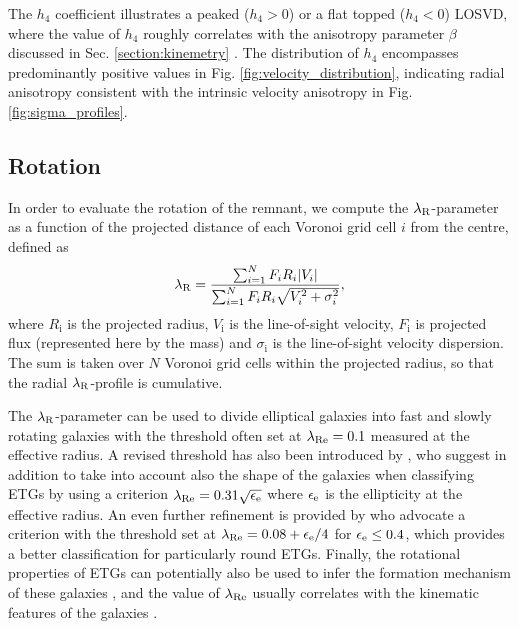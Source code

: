 \documentclass[a4paper,fleqn,usenatbib]{mnras}
\begin{document}
The $h_4$ coefficient illustrates a peaked ($h_4>0$) or a flat topped ($h_4<0$) LOSVD, where the value
of $h_4$ roughly correlates with the anisotropy parameter $\beta$ discussed in Sec. \ref{section:kinemetry}
\citep{1993ApJ...407..525V, 1993MNRAS.265..213G}.
The distribution of $h_4$ encompasses predominantly positive values in Fig. \ref{fig:velocity_distribution}, indicating radial anisotropy
consistent with the intrinsic velocity anisotropy in Fig. \ref{fig:sigma_profiles}.

\subsection{Rotation}


In order to evaluate the rotation of the remnant, we compute the $\lambda_{\rm{R}}$-parameter 
\citep{2007MNRAS.379..401E, 2014MNRAS.444.3357N} as
a function of the projected distance of each Voronoi grid cell $i$ from the centre, defined as
\begin{equation}
 \lambda_{\rm{R}}=\frac{\sum_{i=1}^{N} F_i R_i|V_i|}{\sum_{i=1}^{N} F_i 
R_i\sqrt{V_i^2+\sigma_i^2}},
\end{equation}
where $R_\mathrm{i}$ is the projected radius, $V_\mathrm{i}$ is the 
line-of-sight velocity, $F_\mathrm{i}$ is projected flux (represented here by 
the mass) and $\sigma_\mathrm{i}$ is the line-of-sight velocity dispersion. The
sum is taken over $N$ Voronoi grid cells within the projected radius, so that the radial
$\lambda_{\rm{R}}$-profile is cumulative.

The $\lambda_{\rm{R}}$-parameter can be used to divide elliptical galaxies into fast and slowly 
rotating galaxies with the threshold often set at $\lambda_{\rm{Re}}=0.1$ measured at the effective radius.
A revised threshold has also been
introduced by \citet{2011MNRAS.414..888E}, who suggest in addition to take into account also the shape of 
the galaxies when classifying ETGs by using a criterion $\lambda_{\rm{Re}}=0.31\sqrt{\epsilon_{\rm{e}}}$
where $\epsilon_{\rm{e}}$ is the ellipticity at the effective radius.
An even further refinement is provided by \citet{2016ARA&A..54..597C} who advocate a 
criterion with the threshold set at $\lambda_{\rm{Re}}=0.08+\epsilon_{\rm{e}} /4$
for $\epsilon_{\rm{e}}\le0.4$, which provides a better classification for particularly round ETGs.
Finally, the rotational properties of ETGs can potentially also be used to infer the formation 
mechanism of these galaxies \citep{2009ApJS..182..216K}, and the value of 
$\lambda_{\rm{Re}}$ usually correlates with the kinematic features of the 
galaxies \citep{2007MNRAS.379..418C, 2013MNRAS.433.2812K}.
\end{document}
